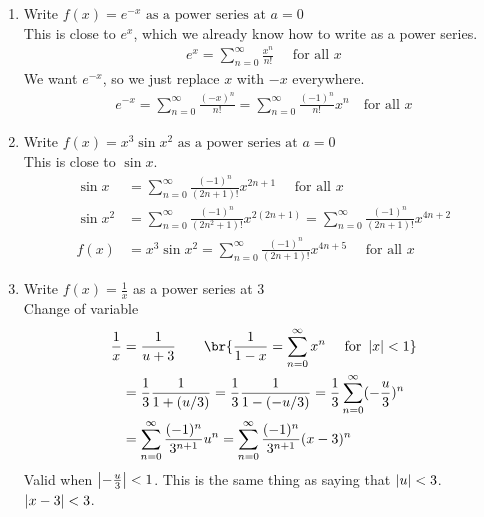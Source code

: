 \begin{enumerate}
    \item Write \(f(x) = e^{-x} \text{ as a power series at } a = 0\) \\
          This is close to \(e^x\), which we already know how to write as a power series. \begin{align*}
              e^x = \sum_{n = 0}^{\infty} \frac{x^n}{n!} \quad \text{ for all } x
          \end{align*}
          We want \(e^{-x}\), so we just replace \(x\) with \(-x\) everywhere. \begin{align*}
              e^{-x} = \sum_{n = 0}^{\infty} \frac{(-x)^n}{n!} = \sum_{n = 0}^{\infty} \frac{(-1)^n}{n!} x^n \quad \text{for all } x
          \end{align*}
    \item Write \(f(x) = x^3 \sin x^2 \text{ as a power series at } a = 0\) \\
          This is close to \(\sin x\). \begin{align*}
              \sin x   & = \sum_{n = 0}^{\infty} \frac{(-1)^n}{(2n+1)!} x^{2n+1} \quad \text{ for all } x                                       \\
              \sin x^2 & = \sum_{n = 0}^{\infty} \frac{(-1)^n}{(2n^2 + 1)!} x^{2(2n+1)} = \sum_{n = 0}^{\infty} \frac{(-1)^n}{(2n+1)!} x^{4n+2} \\
              f(x)     & = x^3 \sin x^2 = \sum_{n = 0}^{\infty} \frac{(-1)^n}{(2n+1)!} x^{4n+5} \quad \text{ for all    } x
          \end{align*}
    \item Write \(f(x) = \frac{1}{x}\) as a power series at \(3\) \\
          Change of variable  \begin{align*}
              \frac{1}{x} & = \frac{1}{u+3} \qquad \br{\frac{1}{1-x} = \sum_{n = 0}^{\infty} x^n \quad \text{ for } \abs{x} < 1}                    \\
                          & = \frac{1}{3} \frac{1}{1 + (u/3)} = \frac{1}{3} \frac{1}{1-(-u/3)} = \frac{1}{3} \sum_{n = 0}^{\infty} (-\frac{u}{3})^n \\
                          & = \sum_{n = 0}^{\infty} \frac{(-1)^n}{3^{n+1}} u^n = \sum_{n = 0}^{\infty} \frac{(-1)^n}{3^{n+1}} (x-3)^n
          \end{align*}
          Valid when \(\left\lvert -\frac{u}{3} \right\rvert < 1\). This is the same thing as saying that \(\left\lvert u \right\rvert < 3\). \(\left\lvert x - 3 \right\rvert < 3\).
\end{enumerate}


